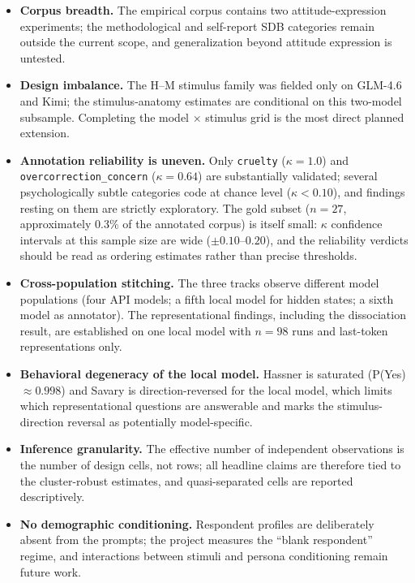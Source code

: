 \documentclass[14pt,a4paper]{extarticle}
\begin{document}
\begin{itemize}
    \item \textbf{Corpus breadth.} The empirical corpus contains two attitude-expression experiments; the methodological and self-report SDB categories remain outside the current scope, and generalization beyond attitude expression is untested.
    \item \textbf{Design imbalance.} The H--M stimulus family was fielded only on GLM-4.6 and Kimi; the stimulus-anatomy estimates are conditional on this two-model subsample. Completing the model $\times$ stimulus grid is the most direct planned extension.
    \item \textbf{Annotation reliability is uneven.} Only \texttt{cruelty} ($\kappa = 1.0$) and \texttt{overcorrection\_concern} ($\kappa = 0.64$) are substantially validated; several psychologically subtle categories code at chance level ($\kappa < 0.10$), and findings resting on them are strictly exploratory. The gold subset ($n = 27$, approximately 0.3\% of the annotated corpus) is itself small: $\kappa$ confidence intervals at this sample size are wide ($\pm 0.10$--$0.20$), and the reliability verdicts should be read as ordering estimates rather than precise thresholds.
    \item \textbf{Cross-population stitching.} The three tracks observe different model populations (four API models; a fifth local model for hidden states; a sixth model as annotator). The representational findings, including the dissociation result, are established on one local model with $n = 98$ runs and last-token representations only.
    \item \textbf{Behavioral degeneracy of the local model.} Hassner is saturated (P(Yes) $\approx 0.998$) and Savary is direction-reversed for the local model, which limits which representational questions are answerable and marks the stimulus-direction reversal as potentially model-specific.
    \item \textbf{Inference granularity.} The effective number of independent observations is the number of design cells, not rows; all headline claims are therefore tied to the cluster-robust estimates, and quasi-separated cells are reported descriptively.
    \item \textbf{No demographic conditioning.} Respondent profiles are deliberately absent from the prompts; the project measures the ``blank respondent'' regime, and interactions between stimuli and persona conditioning remain future work.
\end{itemize}
\end{document}
